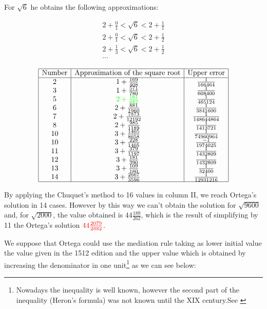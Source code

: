 \documentclass{amsart}
\begin{document}
For $\sqrt{6}$ he obtains the following approximations:

$$
\begin{array}{c}
2+\frac{0}{1}<\sqrt{6}<2+\frac{1}{1}\\
2+\frac{0}{1}<\sqrt{6}<2+\frac{1}{2}\\
2+\frac{1}{3}<\sqrt{6}<2+\frac{1}{2}\\
\cdots 
\end{array}$$
 
 $$\begin{array}{|c|c|c|}
 \hline 
 \text{Number}&\text{Approximation
of the square root}& \text{Upper error}\\
 \hline
 2&1+\frac{169}{408}& \frac{1}{166464}\\
 3&1+\frac{571}{780}& \frac{1}{608400}\\
 5 & {\color{green}2+\frac{161}{682} }& \frac{1}{465124}\\
  6 & 2 +\frac{881}{1960} & \frac{1}{3841600}\\
7  & 2+\frac{7873}{12192} & \frac{1}{148644864}\\
8  & 2+\frac{985}{1189} & \frac{1}{1413721}\\
10  & 3+\frac{1405}{8658} & \frac{1}{74960964}\\
10  & 3+\frac{228}{1405} & \frac{-1}{1974025}\\
11  &3 +\frac{379}{1197} & \frac{1}{1432809}\\
12  & 3+\frac{181}{390} & \frac{1}{1432809}\\
13  & 3+\frac{109}{180} & \frac{1}{32400}\\
 14  &3 +\frac{2667}{3596} & \frac{1}{12931216}\\
 \hline
 \end{array}
 $$

By applying the Chuquet's method to 16 values in column II, we reach  Ortega's solution in 14 cases. However by this way we can't obtain the solution for $\sqrt{9600}$ and, for $\sqrt{2000}$, the value obtained is $44\frac{189}{262}$, which is the result  of simplifying by 11 the Ortega's solution ${\color{red}44 \frac{2079}{2882}}$.

We suppose that Ortega could use the mediation rule taking as lower initial value the value given in the 1512 edition and the upper value which is obtained by increasing the denominator in one unit\footnote{Nowadays the inequality is well known, however the second part of the inequality (Heron's formula) was not known until the XIX century.See \cite{tan1}} as we can see below:
\end{document}
